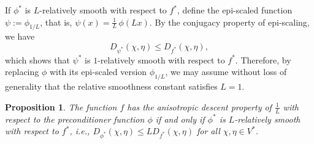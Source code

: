 \documentclass{article}
\theoremstyle{plain}
\newtheorem{proposition}[theorem]{Proposition}
\theoremstyle{definition}
\theoremstyle{remark}
\begin{document}
If $\phi^*$ is $L$-relatively smooth with respect to $f^*$, define the epi-scaled
function $\psi := \phi_{1/L}$, that is, $\psi(x)=\frac{1}{L}\,\phi(Lx).$ By the conjugacy property of epi-scaling, we have
\[
D_{\psi^*}(\chi,\eta)
\le D_{f^*}(\chi,\eta),
\]
which shows that $\psi^*$ is $1$-relatively smooth with respect to $f^*$.
Therefore, by replacing $\phi$ with its epi-scaled version $\phi_{1/L}$, we may
assume without loss of generality that the relative smoothness constant satisfies
$L=1$.




\begin{proposition}
    The function $f$ has the anisotropic descent property of $\frac{1}{L}$ with respect to the preconditioner function $\phi$ if and only if $\phi^*$ is $L$-relatively smooth with respect to $f^*$, i.e., $D_{\phi^*}(\chi, \eta)\leq L D_{f^*}(\chi, \eta)$ for all $\chi, \eta\in V^*$.
\end{proposition}
\end{document}
